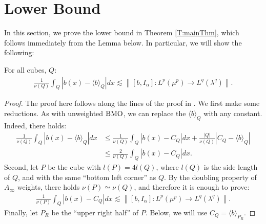 \documentclass[12pt]{amsart}
\begin{document}
\section{Lower Bound}
In this section, we prove the lower bound in Theorem
\ref{T:mainThm}, which follows immediately from the Lemma below. In particular, 
we will show the following:
\begin{lm}
For all cubes, $Q$:
\begin{align*}
\frac{1}{\nu(Q)}\int_{Q}{\ensuremath{\left\vert{b(x)-{\langle {b} \rangle}_{Q}}\right\vert}}dx
\lesssim {\ensuremath{\left\|{[b,I_\alpha]:L^p(\mu^p)\to L^q(\lambda^q)}\right\|}}.
\end{align*}
\end{lm}
\begin{proof}
The proof here follows along the lines of the proof in 
\cite{Chaf2014}. 
We first make some reductions. As with unweighted ${\textnormal{BMO}}$, we can
replace the ${\langle {b} \rangle}_{Q}$ with any constant. Indeed, there holds:
\begin{align*}
\frac{1}{\nu(Q)}\int_{Q}{\ensuremath{\left\vert{b(x)-{\langle {b} \rangle}_{Q}}\right\vert}}dx
&\leq \frac{1}{\nu(Q)}\int_{Q}{\ensuremath{\left\vert{b(x)-C_Q}\right\vert}}dx
  +\frac{{\ensuremath{\left\vert{Q}\right\vert}}}{\nu(Q)}{\ensuremath{\left\vert{C_Q-{\langle {b} \rangle}_{Q}}\right\vert}}
\\&\leq \frac{2}{\nu(Q)}\int_{Q}{\ensuremath{\left\vert{b(x)-C_Q}\right\vert}}dx.
\end{align*}
Second, let $P$ be the cube with $l(P)=4l(Q)$, where $l(Q)$ is 
the side length of $Q$, and
with the same ``bottom left corner'' as $Q$. By the doubling property of $A_\infty$ weights, there holds
$\nu(P)\simeq\nu(Q)$, and therefore it is enough to prove:
\begin{align*}
\frac{1}{\nu(P)}\int_{Q}{\ensuremath{\left\vert{b(x)-C_Q}\right\vert}}dx
\lesssim {\ensuremath{\left\|{[b,I_\alpha]:L^p(\mu^p)\to L^q(\lambda^q)}\right\|}}.
\end{align*}
Finally, let $P_R$ be the ``upper right half'' of $P$. Below, we will
use $C_Q={\langle {b} \rangle}_{P_R}$. 


\end{proof}
\end{document}
